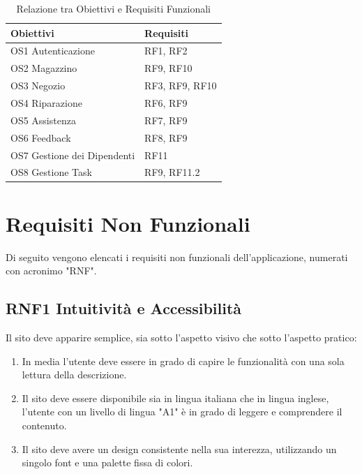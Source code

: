 \documentclass{report}
\begin{document}
\begin{table}[h]
\begin{center} %
	\centering
	\begin{tabular}{ |p{4cm}|p{4cm}|  }
		\hline
		\centering Obiettivi & \qquad\qquad Requisiti \\ %
		\hline
		OS1 Autenticazione & RF1, RF2 \\
		\hline
		OS2 Magazzino & RF9, RF10 \\
		\hline
		OS3 Negozio &
		RF3, RF9, RF10 \\
		\hline
		OS4 Riparazione & RF6, RF9\\
		\hline
		OS5 Assistenza & RF7, RF9 \\
		\hline
		OS6 Feedback & RF8, RF9 \\
		\hline
		OS7 Gestione dei Dipendenti & RF11 \\
		\hline
		OS8 Gestione Task & RF9, RF11.2 \\
		\hline
	\end{tabular}
\caption{Relazione tra Obiettivi e Requisiti Funzionali}
\end{center}
\end{table}

\pagebreak


\section{Requisiti Non Funzionali}
Di seguito vengono elencati i requisiti non funzionali dell’applicazione, numerati con acronimo "RNF".

\subsection*{RNF1 Intuitività e Accessibilità}
Il sito deve apparire semplice, sia sotto l'aspetto visivo che sotto l'aspetto pratico:
\begin{enumerate}
	\item In media l’utente deve essere in grado di capire le funzionalità con una sola lettura della descrizione.
	\item Il sito deve essere disponibile sia in lingua italiana che in lingua inglese, l’utente con un livello di lingua "A1" è in grado di leggere e comprendere il contenuto.
	\item Il sito deve avere un design consistente nella sua interezza, utilizzando un singolo font e una palette fissa di colori.
\end{enumerate}
\end{document}
